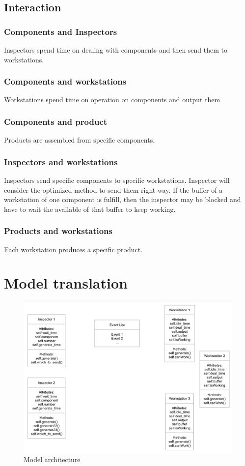 \documentclass{article}
\begin{document}
\subsection{Interaction}

\subsubsection{Components and Inspectors}
Inspectors spend time on dealing with components and then send them to workstations.
\subsubsection{Components and workstations}
Workstations spend time on operation on components and output them
\subsubsection{Components and product}
Products are assembled from specific components.
\subsubsection{Inspectors and workstations}
Inspectors send specific components to specific workstations. Inspector will consider the optimized method to send them right way. If the buffer of a workstation of one component is fulfill, then the inspector may be blocked and have to wait the available of that buffer to keep working.
\subsubsection{Products and workstations}
Each workstation produces a specific product.


\section{Model translation}
\begin{figure}[htbp]
\begin{center}
\includegraphics[width=5in]{Architecture.png}
\caption{Model architecture}
\label{default}
\end{center}
\end{figure}
\end{document}
